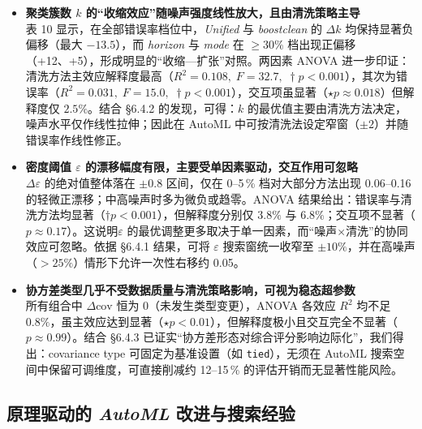 \documentclass[10pt]{article} %
\numberwithin{equation}{section}
\begin{document}
\begin{itemize}[leftmargin=1.6em,itemsep=4pt]
  \item \textbf{聚类簇数 \(k\) 的“收缩效应”随噪声强度线性放大，且由清洗策略主导} \\
  表 10 显示，在全部错误率档位中，\textit{Unified} 与 \textit{boostclean} 的 \(\Delta k\) 均保持显著负偏移（最大 \(-13.5\)），而 \textit{horizon} 与 \textit{mode} 在 \(\ge 30\%\) 档出现正偏移（+12、+5），形成明显的“收缩—扩张”对照。两因素 ANOVA 进一步印证：清洗方法主效应解释度最高（\(R^{2}=0.108,\;F=32.7,\;\dagger p<0.001\)），其次为错误率（\(R^{2}=0.031,\;F=15.0,\;\dagger p<0.001\)），交互项虽显著（\(\star p\approx0.018\)）但解释度仅 \(2.5\%\)。结合 §6.4.2 的发现，可得：\textcolor[rgb]{0.00,0.07,1.00}{\(k\) 的最优值主要由清洗方法决定，噪声水平仅作线性拉伸；因此在 AutoML 中可按清洗法设定窄窗（\(\pm2\)）并随错误率作线性修正。 }

  \item \textbf{密度阈值 \(\varepsilon\) 的漂移幅度有限，主要受单因素驱动，交互作用可忽略} \\
      \(\Delta\varepsilon\) 的绝对值整体落在 \(\pm0.8\) 区间，仅在 0–5\,\% 档对大部分方法出现 0.06–0.16 的轻微正漂移；中高噪声时多为微负或趋零。ANOVA 结果给出：错误率与清洗方法均显著（\(\dagger p<0.001\)），但解释度分别仅 \(3.8\%\) 与 \(6.8\%\)；交互项不显著（\(p\approx0.17\)）。\textcolor[rgb]{0.00,0.07,1.00}{这说明\(\varepsilon\) 的最优调整更多取决于单一因素，而“噪声\(\times\)清洗”的协同效应可忽略。依据 §6.4.1 结果，可将  \(\varepsilon\) 搜索窗统一收窄至 \(\pm10\%\)，并在高噪声（\(>25\%\)）情形下允许一次性右移约 0.05。  }

  \item \textbf{协方差类型几乎不受数据质量与清洗策略影响，可视为稳态超参数} \\
  所有组合中 \(\Delta\text{cov}\) 恒为 0（未发生类型变更），ANOVA 各效应 \(R^{2}\) 均不足 \(0.8\%\)，虽主效应达到显著（\(\star p<0.01\)），但解释度极小且交互完全不显著（\(p\approx0.99\)）。结合 §6.4.3 已证实“协方差形态对综合评分影响边际化”，我们得出：\textcolor[rgb]{0.00,0.07,1.00}{covariance type 可固定为基准设置（如 \texttt{tied}），无须在 AutoML 搜索空间中保留可调维度，可直接削减约 12–15\,\% 的评估开销而无显著性能风险。 }
\end{itemize}

\subsection{原理驱动的 \textit{AutoML} 改进与搜索经验}
\label{sec:6.5}
\end{document}
